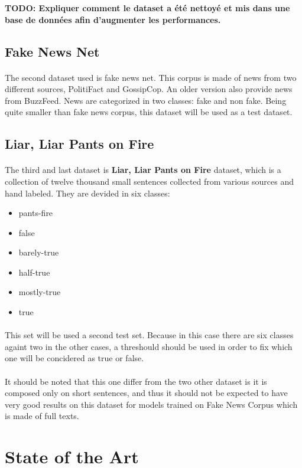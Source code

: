 \textbf{TODO: Expliquer comment le dataset a été nettoyé et mis dans une base de données afin d'augmenter les performances. }

\subsection{Fake News Net}
\paragraph{}
The second dataset used is fake news net\cite{shu2018fakenewsnet,shu2017exploiting,shu2017fake}. This corpus is made of news from two different sources, PolitiFact and GossipCop. An older version also provide news from BuzzFeed. News are categorized in two classes: fake and non fake. Being quite smaller than fake news corpus, this dataset will be used as a test dataset. 

\subsection{Liar, Liar Pants on Fire}
\paragraph{}
The third and last dataset is \textbf{Liar, Liar Pants on Fire} dataset\cite{Wang2017}, which is a collection of twelve thousand small sentences collected from various sources and hand labeled. They are devided in six classes:
\begin{itemize}
	\item pants-fire
	\item false
	\item barely-true
	\item half-true
	\item mostly-true
	\item true
\end{itemize} 
\paragraph{}
This set will be used a second test set. Because in this case there are six classes againt two in the other cases, a threshould should be used in order to fix which one will be concidered as true or false. 
\paragraph{}
It should be noted that this one differ from the two other dataset is it is composed only on short sentences, and thus it should not be expected to have very good results on this dataset for models trained on Fake News Corpus which is made of full texts. 

\section{State of the Art}
